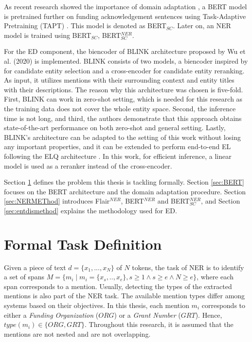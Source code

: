 \documentclass{report}
\theoremstyle{definition}
\theoremstyle{remark}
\begin{document}
As recent research showed the importance of domain adaptation \cite{DontStop,exBERT,quote3}, a BERT model is pretrained further on funding acknowledgement sentences using Task-Adaptive Pretraining (TAPT) \cite{DontStop}. This model is denoted as BERT$_{SC}$. Later on, an NER model is trained using BERT$_{SC}$, BERT$_{SC}^{NER}$. 

For the ED component, the biencoder of BLINK architecture proposed by Wu et al. (2020) \cite{scalablezeroshot} is implemented. BLINK consists of two models, a biencoder inspired by \cite{polyencoder} for candidate entity selection and a cross-encoder \cite{polyencoder} for candidate entity reranking. As input, it utilizes mentions with their surrounding context and entity titles with their descriptions. The reason why this architecture was chosen is five-fold. First, BLINK can work in zero-shot setting, which is needed for this research as the training data does not cover the whole entity space. Second, the inference time is not long, and third, the authors demonstrate that this approach obtains state-of-the-art performance on both zero-shot and general setting. Lastly, BLINK's architecture can be adapted to the setting of this work without losing any important properties, and it can be extended to perform end-to-end EL following the ELQ architecture \cite{elq}. In this work, for efficient inference, a linear model is used as a reranker instead of the cross-encoder.

Section \ref{sec:taskdef} defines the problem this thesis is tackling formally. Section \ref{sec:BERT} focuses on the BERT architecture and the domain adaptation procedure. Section \ref{sec:NERMEThod} introduces Flair$^{NER}$, BERT$^{NER}$ and BERT$_{SC}^{NER}$, and Section \ref{sec:entdismethod} explains the methodology used for ED.


\section{Formal Task Definition}
\label{sec:taskdef}
Given a piece of text $d=\{x_1,...,x_N\}$ of $N$ tokens, the task of NER is to identify a set of spans $M = \{m_i \mid m_i = \{x_s,..,x_e\}, s \geq 1 \land s\geq e \land N \geq e\}$, where each span corresponds to a mention. Usually, detecting the types of the extracted mentions is also part of the NER task. The available mention types differ among systems based on their objectives. In this thesis, each mention $m_i$ corresponds to either a \textit{Funding Organization} ($ORG$)  or a \textit{Grant Number} ($GRT$). Hence, $type(m_i) \in \{ORG,GRT\}$. Throughout this research, it is assumed that the mentions are not nested and are not overlapping.
\end{document}
